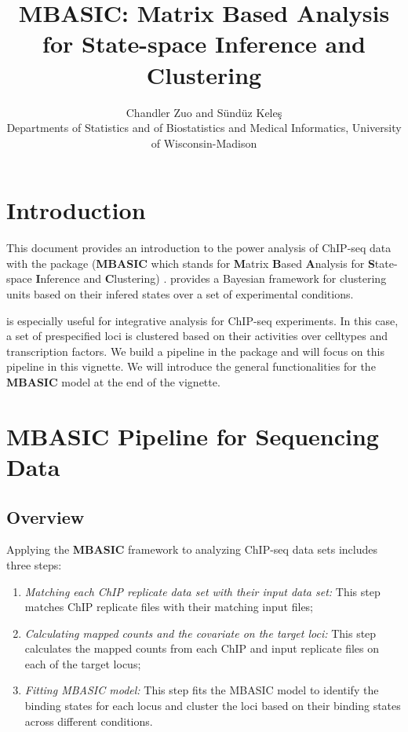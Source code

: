 \documentclass[a4paper,10pt]{article}\usepackage[]{graphicx}\usepackage[]{color}
\title{MBASIC: Matrix Based Analysis for State-space Inference and Clustering}
\author{Chandler Zuo and S\"und\"uz Kele\c{s}\\
  Departments of Statistics and of  Biostatistics and Medical Informatics, University of Wisconsin-Madison}
\date{}
\begin{document}
\maketitle

\tableofcontents

\section{Introduction}

This document provides an introduction to the power analysis of ChIP-seq data with the  package (\textbf{MBASIC} which stands for \textbf{M}atrix \textbf{B}ased \textbf{A}nalysis for \textbf{S}tate-space \textbf{I}nference and \textbf{C}lustering) \cite{zuo14}.  provides a Bayesian framework for clustering units based on their infered states over a set of experimental conditions.

 is especially useful for integrative analysis for ChIP-seq experiments. In this case, a set of prespecified loci is clustered based on their activities over celltypes and transcription factors. We build a pipeline in the  package and will focus on this pipeline in this vignette. We will introduce the general functionalities for the \textbf{MBASIC} model at the end of the vignette.

\section{MBASIC Pipeline for Sequencing Data}

\subsection{Overview}

Applying the \textbf{MBASIC} framework to analyzing ChIP-seq data sets includes three steps:

\begin{enumerate}
\item \textit{Matching each ChIP replicate data set with their input data set:} This step matches ChIP replicate files with their matching input files;
\item \textit{Calculating mapped counts and the covariate on the target loci:} This step calculates the mapped counts from each ChIP and input replicate files on each of the target locus;
\item \textit{Fitting MBASIC model:} This step fits the MBASIC model to identify the binding states for each locus and cluster the loci based on their binding states across different conditions.
\end{enumerate}
\end{document}
